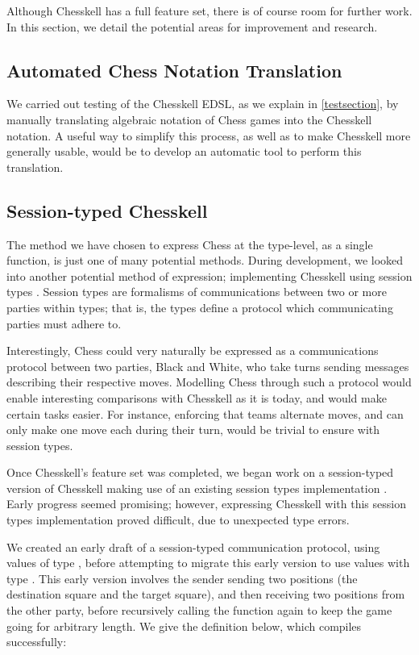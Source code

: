 Although Chesskell has a full feature set, there is of course room for further work. In this section, we detail the potential areas for improvement and research.

\subsection{Automated Chess Notation Translation}

We carried out testing of the Chesskell EDSL, as we explain in \cref{testsection}, by manually translating algebraic notation of Chess games into the Chesskell notation. A useful way to simplify this process, as well as to make Chesskell more generally usable, would be to develop an automatic tool to perform this translation.

\subsection{Session-typed Chesskell}

The method we have chosen to express Chess at the type-level, as a single function, is just one of many potential methods. During development, we looked into another potential method of expression; implementing Chesskell using session types \cite{torinosessions}. Session types are formalisms of communications between two or more parties within types; that is, the types define a protocol which communicating parties must adhere to.

Interestingly, Chess could very naturally be expressed as a communications protocol between two parties, Black and White, who take turns sending messages describing their respective moves. Modelling Chess through such a protocol would enable interesting comparisons with Chesskell as it is today, and would make certain tasks easier. For instance, enforcing that teams alternate moves, and can only make one move each during their turn, would be trivial to ensure with session types.

Once Chesskell's feature set was completed, we began work on a session-typed version of Chesskell making use of an existing session types implementation \cite{sesstypesincloudhaskell}. Early progress seemed promising; however, expressing Chesskell with this session types implementation proved difficult, due to unexpected type errors.

We created an early draft of a session-typed communication protocol, using values of type , before attempting to migrate this early version to use  values with type . This early version involves the sender sending two positions (the destination square and the target square), and then receiving two positions from the other party, before recursively calling the function again to keep the game going for arbitrary length. We give the definition below, which compiles successfully:


